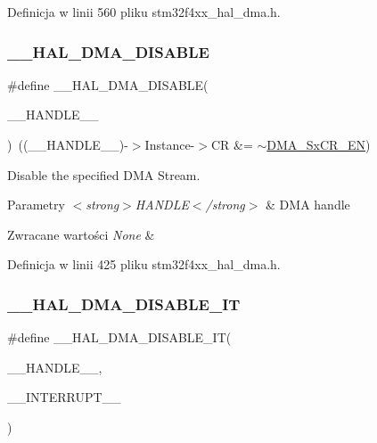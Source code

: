 Definicja w linii 560 pliku stm32f4xx\+\_\+hal\+\_\+dma.\+h.

\mbox{\label{group___d_m_a_gafeef4c5e8c3f015cdecc0f37bbe063dc}} 
\subsubsection{\texorpdfstring{\+\_\+\+\_\+\+H\+A\+L\+\_\+\+D\+M\+A\+\_\+\+D\+I\+S\+A\+B\+LE}{\_\_HAL\_DMA\_DISABLE}}
{\footnotesize\ttfamily \#define \+\_\+\+\_\+\+H\+A\+L\+\_\+\+D\+M\+A\+\_\+\+D\+I\+S\+A\+B\+LE(\begin{DoxyParamCaption}\item[{}]{\+\_\+\+\_\+\+H\+A\+N\+D\+L\+E\+\_\+\+\_\+ }\end{DoxyParamCaption})~((\+\_\+\+\_\+\+H\+A\+N\+D\+L\+E\+\_\+\+\_\+)-\/$>$Instance-\/$>$CR \&=  $\sim$\hyperlink{group___peripheral___registers___bits___definition_gaabf69fe92e9a44167535365b0fe4ea9e}{D\+M\+A\+\_\+\+Sx\+C\+R\+\_\+\+EN})}



Disable the specified D\+MA Stream. 


\begin{DoxyParams}{Parametry}
{\em $<$strong$>$\+H\+A\+N\+D\+L\+E$<$/strong$>$} & D\+MA handle \\
\hline
\end{DoxyParams}

\begin{DoxyRetVals}{Zwracane wartości}
{\em None} & \\
\hline
\end{DoxyRetVals}


Definicja w linii 425 pliku stm32f4xx\+\_\+hal\+\_\+dma.\+h.

\mbox{\label{group___d_m_a_ga2867eab09398df2daac55c3f327654da}} 
\subsubsection{\texorpdfstring{\+\_\+\+\_\+\+H\+A\+L\+\_\+\+D\+M\+A\+\_\+\+D\+I\+S\+A\+B\+L\+E\+\_\+\+IT}{\_\_HAL\_DMA\_DISABLE\_IT}}
{\footnotesize\ttfamily \#define \+\_\+\+\_\+\+H\+A\+L\+\_\+\+D\+M\+A\+\_\+\+D\+I\+S\+A\+B\+L\+E\+\_\+\+IT(\begin{DoxyParamCaption}\item[{}]{\+\_\+\+\_\+\+H\+A\+N\+D\+L\+E\+\_\+\+\_\+,  }\item[{}]{\+\_\+\+\_\+\+I\+N\+T\+E\+R\+R\+U\+P\+T\+\_\+\+\_\+ }\end{DoxyParamCaption})}

